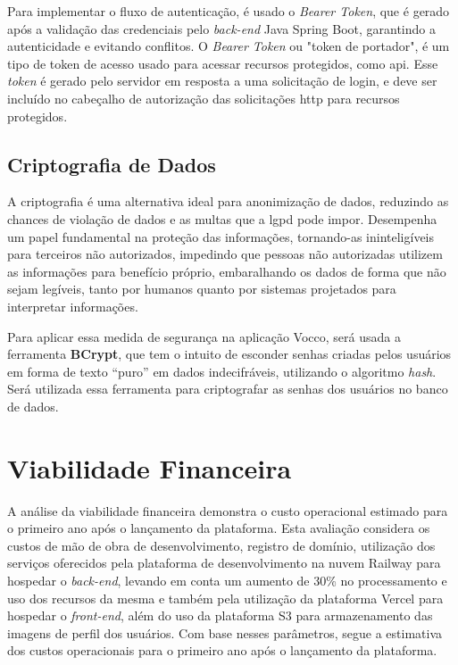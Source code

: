 Para implementar o fluxo de autenticação, é usado o \textit{Bearer Token}, que é gerado após a validação das credenciais pelo \textit{back-end} Java Spring Boot, garantindo a autenticidade e evitando conflitos.
O \textit{Bearer Token} ou "token de portador", é um tipo de token de acesso usado para acessar recursos protegidos, como \ac{api}. Esse \textit{token} é gerado pelo servidor em resposta a uma solicitação de login, e deve ser incluído no cabeçalho de autorização das solicitações \ac{http} para recursos protegidos.


\subsection{Criptografia de Dados}
A criptografia é uma alternativa ideal para anonimização de dados, reduzindo as chances de violação de dados e as multas que a \ac{lgpd} pode impor. Desempenha um papel fundamental na proteção das informações, tornando-as ininteligíveis para terceiros não autorizados, impedindo que pessoas não autorizadas utilizem as informações para benefício próprio, embaralhando os dados de forma que não sejam legíveis, tanto por humanos quanto por sistemas projetados para interpretar informações.

Para aplicar essa medida de segurança na aplicação Vocco, será usada a ferramenta \textbf{BCrypt}, que tem o intuito de esconder senhas criadas pelos usuários em forma de texto “puro” em dados indecifráveis, utilizando o algoritmo \textit{hash}.
Será utilizada essa ferramenta para criptografar as senhas dos usuários no banco de dados. 


\section{Viabilidade Financeira}
A análise da viabilidade financeira demonstra o custo operacional estimado para o primeiro ano após o lançamento da plataforma. Esta avaliação considera os custos de mão de obra de desenvolvimento, registro de domínio, utilização dos serviços oferecidos pela plataforma de desenvolvimento na nuvem Railway para hospedar o \textit{back-end}, levando em conta um aumento de 30\% no processamento e uso dos recursos da mesma e também pela utilização da plataforma Vercel para hospedar o \textit{front-end}, além do uso da plataforma S3 para armazenamento das imagens de perfil dos usuários. Com base nesses parâmetros, segue a estimativa dos custos operacionais para o primeiro ano após o lançamento da plataforma.

